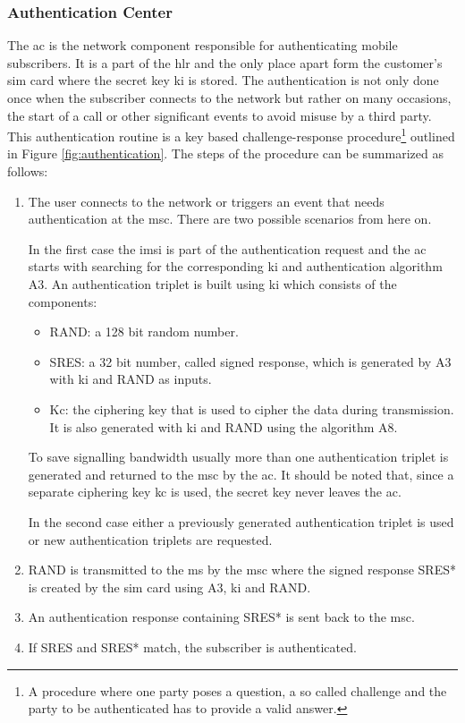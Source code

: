 \subsubsection{Authentication Center}
\label{sec:authentication}
The \gls{ac} is the network component responsible for authenticating mobile subscribers.
It is a part of the \gls{hlr} and the only place apart form the customer's \gls{sim} card where the secret key \gls{ki} is stored.
The authentication is not only done once when the subscriber connects to the network but rather on many occasions, \eg the start of a call or other significant events to avoid misuse by a third party.
This authentication routine is a key based challenge-response procedure\footnote{A procedure where one party poses a question, a so called challenge and the party to be authenticated has to provide a valid answer.} outlined in Figure \ref{fig:authentication}.
The steps of the procedure can be summarized as follows:
\begin{enumerate}
	\item The user connects to the network or triggers an event that needs authentication at the \gls{msc}.
	There are two possible scenarios from here on.
 	
 	In the first case the \gls{imsi} is part of the authentication request and the \gls{ac} starts with searching for the corresponding \gls{ki} and authentication algorithm A3.
	An authentication triplet is built using \gls{ki} which consists of the components:
	\begin{itemize}
		\item RAND: a 128 bit random number.
		\item SRES: a 32 bit number, called signed response, which is generated by A3 with \gls{ki} and RAND as inputs.
		\item Kc: the ciphering key that is used to cipher the data during transmission.
		It is also generated with \gls{ki} and RAND using the algorithm A8.
	\end{itemize}
	To save signalling bandwidth usually more than one authentication triplet is generated and returned to the \gls{msc} by the \gls{ac}.
	It should be noted that, since a separate ciphering key \gls{kc} is used, the secret key never leaves the \gls{ac}.
	
	In the second case either a previously generated authentication triplet is used or new authentication triplets are requested.
	\item RAND is transmitted to the \gls{ms} by the \gls{msc} where the signed response SRES* is created by the \gls{sim} card using A3, \gls{ki} and RAND.
	
	\item An authentication response containing SRES* is sent back to the \gls{msc}.
	
	\item If SRES and SRES* match, the subscriber is authenticated.
\end{enumerate}

